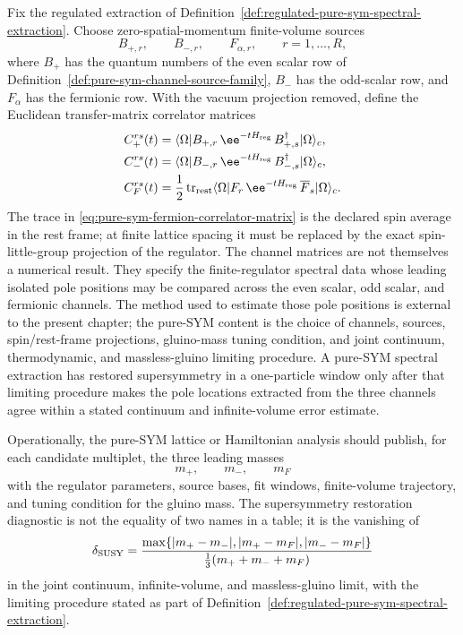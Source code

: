 \begin{definition}
\label{def:pure-sym-channel-correlator-matrices}
Fix the regulated extraction of
Definition~\ref{def:regulated-pure-sym-spectral-extraction}.  Choose
zero-spatial-momentum finite-volume sources
\[
  B_{+,r},\qquad B_{-,r},\qquad F_{\alpha,r},
  \qquad r=1,\ldots,R ,
\]
where \(B_+\) has the quantum numbers of the even scalar row of
Definition~\ref{def:pure-sym-channel-source-family}, \(B_-\) has the
odd-scalar row, and \(F_\alpha\) has the fermionic row.  With the vacuum
projection removed, define the Euclidean transfer-matrix correlator matrices
\begin{align}
  C_{+}^{rs}(t)
  &=
  \langle\Omega|B_{+,r}\,\ee^{-tH_{\rm reg}}\,B_{+,s}^{\dagger}|\Omega\rangle_c,
  \label{eq:pure-sym-even-correlator-matrix}\\
  C_{-}^{rs}(t)
  &=
  \langle\Omega|B_{-,r}\,\ee^{-tH_{\rm reg}}\,B_{-,s}^{\dagger}|\Omega\rangle_c,
  \label{eq:pure-sym-odd-correlator-matrix}\\
  C_{F}^{rs}(t)
  &=
  \frac12\operatorname{tr}_{\rm rest}
  \langle\Omega|F_r\,\ee^{-tH_{\rm reg}}\,\overline F_s|\Omega\rangle_c .
  \label{eq:pure-sym-fermion-correlator-matrix}
\end{align}
The trace in \eqref{eq:pure-sym-fermion-correlator-matrix} is the declared
spin average in the rest frame; at finite lattice spacing it must be replaced
by the exact spin-little-group projection of the regulator.  The channel
matrices are not themselves a numerical result.  They specify the
finite-regulator spectral data whose leading isolated pole positions may be
compared across the even scalar, odd scalar, and fermionic channels.  The
method used to estimate those pole positions is external to the present
chapter; the pure-SYM content is the choice of channels, sources,
spin/rest-frame projections, gluino-mass tuning condition, and joint
continuum, thermodynamic, and massless-gluino limiting procedure.  A
pure-SYM spectral extraction has restored supersymmetry in a one-particle
window only after that limiting procedure makes the pole locations extracted
from the three channels agree within a stated continuum and infinite-volume
error estimate.
\end{definition}

Operationally, the pure-SYM lattice or Hamiltonian analysis should publish,
for each candidate multiplet, the three leading masses
\[
  m_+,\qquad m_-,\qquad m_F
\]
with the regulator parameters, source bases, fit windows, finite-volume
trajectory, and tuning condition for the gluino mass.  The supersymmetry
restoration diagnostic is not the equality of two names in a table; it is the
vanishing of
\begin{equation}
  \delta_{\rm SUSY}
  =
  \frac{\max\{|m_+-m_-|,|m_+-m_F|,|m_--m_F|\}}
       {\frac13(m_++m_-+m_F)}
  \label{eq:pure-sym-spectral-susy-diagnostic}
\end{equation}
in the joint continuum, infinite-volume, and massless-gluino limit, with the
limiting procedure stated as part of
Definition~\ref{def:regulated-pure-sym-spectral-extraction}.

